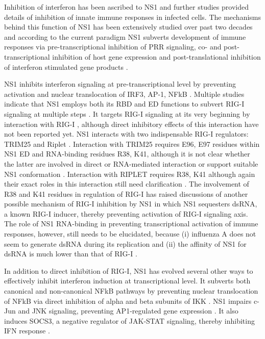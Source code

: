 		Inhibition of interferon has been ascribed to NS1 and further studies provided details of inhibition of innate immune responses in infected cells. The mechanisms behind this function of NS1 has been extensively studied over past two decades and according to the current paradigm NS1 subverts development of immune responses via pre-transcriptional inhibition of PRR signaling, co- and post-transcriptional inhibition of host gene expression and post-translational inhibition of interferon stimulated gene products \parencite{Ayllon2014}.		
		
		\gls{NS1} inhibits interferon signaling at pre-transcriptional level by preventing activation and nuclear translocation of IRF3, AP-1, NFkB \parencite{Talon2000, Ludwig2002, Wang2000, Geiss2002, Munir2012}. Multiple studies indicate that NS1 employs both its \gls{RBD} and \gls{ED} functions to subvert \gls{RIG-I} signaling at multiple steps \parencite{Haye2009, Ludwig2002, Tisoncik2011, Wang2000}. It targets \gls{RIG-I} signaling at its very beginning by interaction with \gls{RIG-I}  \parencite{Opitz2007, Mibayashi2007a}, although direct inhibitory effects of this interaction have not been reported yet. NS1 interacts with two indispensable \gls{RIG-I} regulators: TRIM25 and Riplet \parencite{Gack2009, Rajsbaum2012}. Interaction with TRIM25 requires E96, E97 residues within NS1 ED and RNA-binding residues R38, K41, although it is not clear whether the latter are involved in direct or RNA-mediated interaction or support suitable NS1 conformation \parencite{Gack2009}. Interaction with RIPLET requires R38, K41 although again their exact roles in this interaction still need clarification \parencite{Rajsbaum2012}. The involvement of R38 and K41 residues in regulation of RIG-I has raised discussions of another possible mechanism of RIG-I inhibition by NS1 in which NS1 sequesters dsRNA, a known RIG-I inducer, thereby preventing activation of RIG-I signaling axis. The role of NS1 RNA-binding in preventing transcriptional activation of immune responses, however, still needs to be elucidated, because (i) influenza A does not seem to generate dsRNA during its replication \parencite{Wisskirchen2011} and (ii) the affinity of NS1 for dsRNA is much lower than that of RIG-I \parencite{Chien2004, Yin2007, Vela2012}.
		
		In addition to direct inhibition of RIG-I, NS1 has evolved several other ways to  effectively inhibit interferon induction at transcriptional level. It subverts both canonical and non-canonical \gls{NFkB} pathways \parencite{Ruckle2012a} by preventing nuclear translocation of \gls{NFkB} via direct inhibition of alpha and beta subunits of \gls{IKK} \parencite{Gao2012}. \gls{NS1} impairs c-Jun and JNK signaling, preventing \gls{AP1}-regulated gene expression \parencite{Ludwig2002}. It also induces \gls{SOCS3}, a negative regulator of \gls{JAK}-STAT signaling, thereby inhibiting \gls{IFN} response \parencite{Pauli2008}. 
		
